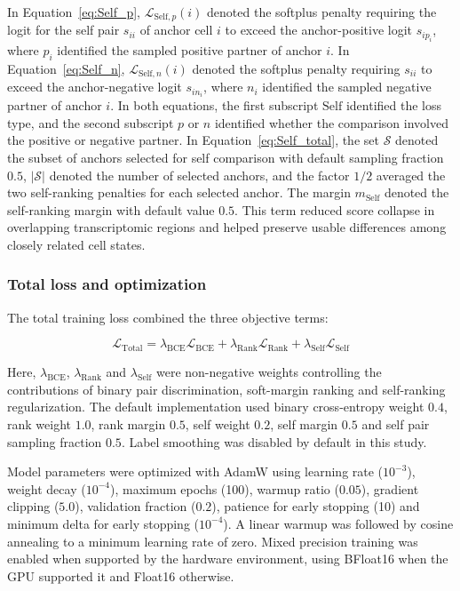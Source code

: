 \documentclass[11pt]{article}
\begin{document}
In Equation~\ref{eq:Self_p}, \(\mathcal{L}_{\mathrm{Self},p}(i)\) denoted the softplus penalty requiring the logit for the self pair \(s_{ii}\) of anchor cell \(i\) to exceed the anchor-positive logit \(s_{ip_i}\), where \(p_i\) identified the sampled positive partner of anchor \(i\). In Equation~\ref{eq:Self_n}, \(\mathcal{L}_{\mathrm{Self},n}(i)\) denoted the softplus penalty requiring \(s_{ii}\) to exceed the anchor-negative logit \(s_{in_i}\), where \(n_i\) identified the sampled negative partner of anchor \(i\). In both equations, the first subscript \(\mathrm{Self}\) identified the loss type, and the second subscript \(p\) or \(n\) identified whether the comparison involved the positive or negative partner. In Equation~\ref{eq:Self_total}, the set \(\mathcal{S}\) denoted the subset of anchors selected for self comparison with default sampling fraction $0.5$, \(|\mathcal{S}|\) denoted the number of selected anchors, and the factor \(1/2\) averaged the two self-ranking penalties for each selected anchor. The margin \(m_{\mathrm{Self}}\) denoted the self-ranking margin with default value $0.5$. This term reduced score collapse in overlapping transcriptomic regions and helped preserve usable differences among closely related cell states.

\subsubsection*{Total loss and optimization}

The total training loss combined the three objective terms:

\begin{equation}
\mathcal{L}_{\mathrm{Total}}=
\lambda_{\mathrm{BCE}}\mathcal{L}_{\mathrm{BCE}}
+
\lambda_{\mathrm{Rank}}\mathcal{L}_{\mathrm{Rank}}
+
\lambda_{\mathrm{Self}}\mathcal{L}_{\mathrm{Self}}
  \label{eq:L_total}
\end{equation}

Here, $\lambda_{\mathrm{BCE}}$, $\lambda_{\mathrm{Rank}}$ and $\lambda_{\mathrm{Self}}$ were non-negative weights controlling the contributions of binary pair discrimination, soft-margin ranking and self-ranking regularization. The default implementation used binary cross-entropy weight $0.4$, rank weight $1.0$, rank margin $0.5$, self weight $0.2$, self margin $0.5$ and self pair sampling fraction $0.5$. Label smoothing was disabled by default in this study.

Model parameters were optimized with AdamW using learning rate ($10^{-3}$), weight decay ($10^{-4}$), maximum epochs (100), warmup ratio ($0.05$), gradient clipping ($5.0$), validation fraction ($0.2$), patience for early stopping (10) and minimum delta for early stopping ($10^{-4}$). A linear warmup was followed by cosine annealing to a minimum learning rate of zero. Mixed precision training was enabled when supported by the hardware environment, using BFloat16 when the GPU supported it and Float16 otherwise.
\end{document}
